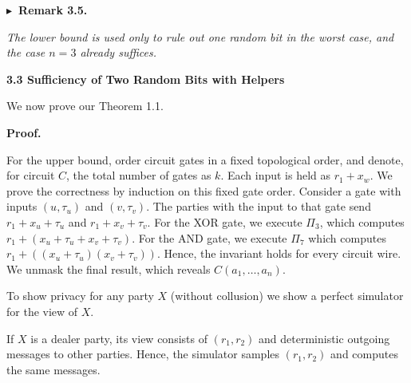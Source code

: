 

\par\medskip\noindent\textbf{
$\blacktriangleright$ Remark 3.5.
}\par



\emph{The lower bound is used only to rule out one random bit in the worst case, and the case $n=3$ already suffices.}\par








\par\medskip\noindent\textbf{
3.3 Sufficiency of Two Random Bits with Helpers}\par




We now prove our Theorem 1.1.\par




\par\medskip\noindent\textbf{Proof.}\par




For the upper bound, order circuit gates in a fixed topological order, and denote, for circuit $C$, the total number of gates as $k$. Each input is held as $r_{1}+x_{w}$. We prove the correctness by induction on this fixed gate order. Consider a gate with inputs $(u,\tau_{u})$ and $(v,\tau_{v})$. The parties with the input to that gate send $r_{1}+x_{u}+\tau_{u}$ and $r_{1}+x_{v}+\tau_{v}$. For the XOR gate, we execute $\Pi_{3}$, which computes $r_{1}+(x_{u}+\tau_{u}+x_{v}+\tau_{v})$. For the AND gate, we execute $\Pi_{7}$ which computes $r_{1}+((x_{u}+\tau_{u})(x_{v}+\tau_{v}))$. Hence, the invariant holds for every circuit wire. We unmask the final result, which reveals $C(a_{1},\dots,a_{n})$.\par




To show privacy for any party $X$ (without collusion) we show a perfect simulator for the view of $X$.\par




If $X$ is a dealer party, its view consists of $(r_{1},r_{2})$ and deterministic outgoing messages to other parties. Hence, the simulator samples $(r_{1},r_{2})$ and computes the same messages.\par




